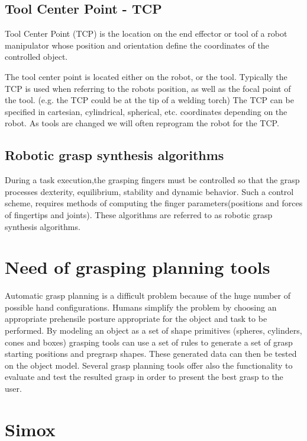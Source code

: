 \documentclass{book}
\begin{document}
\subsection*{Tool Center Point - TCP}
Tool Center Point (TCP) is the location on the end effector or tool of a robot manipulator whose position and orientation define the coordinates of the controlled object.\par
The tool center point is located either on the robot, or the tool. Typically the TCP is used when referring to the robots position, as well as the focal point of the tool. (e.g. the TCP could be at the tip of a welding torch) The TCP can be specified in cartesian, cylindrical, spherical, etc. coordinates depending on the robot. As tools are changed we will often reprogram the robot for the TCP.
\subsection*{Robotic grasp synthesis algorithms}
During a task execution,the grasping fingers must be controlled
so that the grasp processes dexterity, equilibrium, stability and
dynamic behavior. Such a control scheme, requires methods of
computing the finger parameters(positions and forces of fingertips
and joints). These algorithms are referred to as robotic grasp
synthesis algorithms.
\section{Need of grasping planning tools}
\par
Automatic grasp planning is a difficult problem because of the huge number of possible hand configurations. Humans simplify the problem by choosing an appropriate prehensile posture appropriate for the object and task to be performed. By modeling an object as a set of shape primitives (spheres, cylinders, cones and boxes) grasping tools can use a set of rules to generate a set of grasp starting positions and pregrasp shapes. These generated data can then be tested on the object model. Several grasp planning tools offer also the functionality to evaluate and test the resulted grasp in order to present the best grasp to the user.
\section{Simox}
\end{document}
